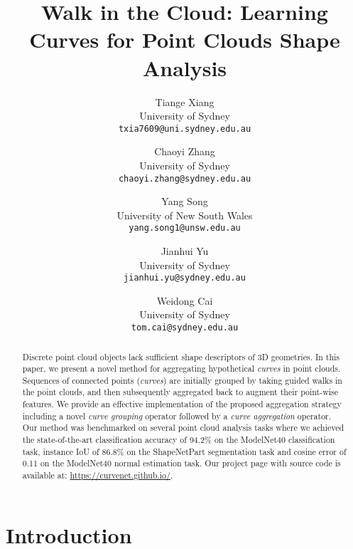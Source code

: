 \documentclass[10pt,twocolumn,letterpaper]{article}
\theoremstyle{definition}
\begin{document}
\title{\vspace{-3em}Walk in the Cloud: Learning Curves for Point Clouds Shape Analysis}

\author{Tiange Xiang\\
University of Sydney\\
{\tt\small txia7609@uni.sydney.edu.au}
\and
Chaoyi Zhang\\
University of Sydney\\
{\tt\small chaoyi.zhang@sydney.edu.au}

\and
Yang Song\\
University of New South Wales\\
{\tt\small yang.song1@unsw.edu.au}

\and
Jianhui Yu\\
University of Sydney\\
{\tt\small jianhui.yu@sydney.edu.au}

\and
Weidong Cai\\
University of Sydney\\
{\tt\small tom.cai@sydney.edu.au}
}

\maketitle
\ificcvfinal\thispagestyle{empty}\fi

\begin{abstract}
   Discrete point cloud objects lack sufficient shape descriptors of 3D geometries. In this paper, we present a novel method for aggregating hypothetical \textit{curves} in point clouds. Sequences of connected points (\textit{curves}) are initially grouped by taking guided walks in the point clouds, and then subsequently aggregated back to augment their point-wise features. We provide an effective implementation of the proposed aggregation strategy including a novel \textit{curve grouping} operator followed by a \textit{curve aggregation} operator. Our method was benchmarked on several point cloud analysis tasks where we achieved the state-of-the-art classification accuracy of 94.2\% on the ModelNet40 classification task, instance IoU of 86.8\% on the ShapeNetPart segmentation task and cosine error of 0.11 on the ModelNet40 normal estimation task. Our project page with source code is available at: \url{https://curvenet.github.io/}.
   
\end{abstract}

\section{Introduction}
\end{document}
